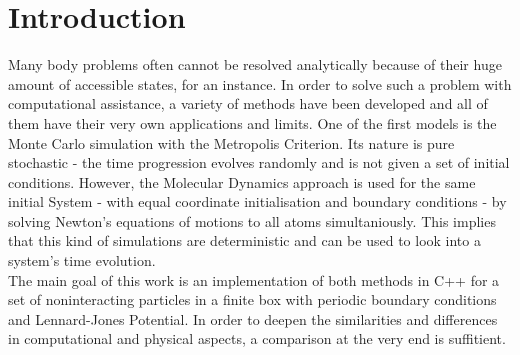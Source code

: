 \section{Introduction}
Many body problems often cannot be resolved analytically because of their huge amount of accessible states, for an instance.
In order to solve such a problem with computational assistance, a variety of methods have been developed and all of them have their very own applications and limits.
One of the first models is the Monte Carlo simulation with the Metropolis Criterion.
Its nature is pure stochastic - the time progression evolves randomly and is not given a set of initial conditions.
However, the Molecular Dynamics approach is used for the same initial System - with equal coordinate initialisation and boundary conditions - by solving Newton's equations of motions to all atoms simultaniously.
This implies that this kind of simulations are deterministic and can be used to look into a system's time evolution.\medskip\\
The main goal of this work is an implementation of both methods in C++ for a set of noninteracting particles in a finite box with periodic boundary conditions and Lennard-Jones Potential.
In order to deepen the similarities and differences in computational and physical aspects, a comparison at the very end is suffitient.
